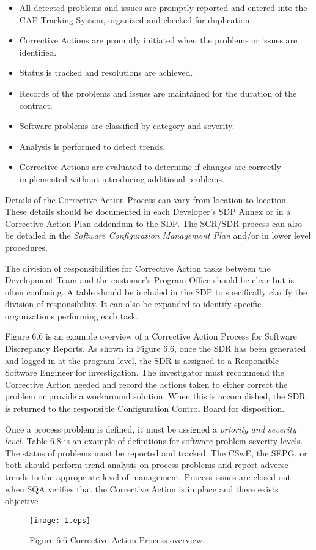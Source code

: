 \documentclass[8pt,twocolumn]{amsart}
\theoremstyle{plain}
\begin{document}
\begin{itemize}
\item All detected problems and issues are promptly reported and entered into the CAP Tracking System, organized and checked for duplication.
\item Corrective Actions are promptly initiated when the problems or issues are identified. 
\item Status is tracked and resolutions are achieved.
\item Records of the problems and issues are maintained for the duration of the contract.
\item Software problems are classified by category and severity.
\item Analysis is performed to detect trends.
\item Corrective Actions are evaluated to determine if changes are correctly implemented without introducing additional problems.
\end{itemize}

Details of the Corrective Action Process can vary from location to location. These details should be documented in each Developer's SDP Annex or in a Corrective Action Plan addendum to the SDP. The SCR/SDR process can also be detailed in the {\em Software Configuration Management Plan} and/or in lower level procedures.

The division of responsibilities for Corrective Action tasks between the Development Team and the customer's Program Office should be clear but is often confusing. A table should be included in the SDP to specifically clarify the division of responsibility. It can also be expanded to identify specific organizations performing each task.

Figure 6.6 is an example overview of a Corrective Action Process for Software Discrepancy Reports. As shown in Figure 6.6, once the SDR has been generated and logged in at the program level, the SDR is assigned to a Responsible Software Engineer for investigation. The investigator must recommend the Corrective Action needed and record the actions taken to either correct the problem or provide a workaround solution. When this is accomplished, the SDR is returned to the responsible Configuration Control Board for disposition.

Once a process problem is defined, it must be assigned a {\em priority and severity level.} Table 6.8 is an example of definitions for software problem severity levels. The status of problems must be reported and tracked. The CSwE, the SEPG, or both should perform trend analysis on process problems and report adverse trends to the appropriate level of management. Process issues are closed out when SQA verifies that the Corrective Action is in place and there exists objective
\onecolumn
\begin{figure*}[h!]
 \centering
  \texttt{[image: 1.eps]}
 \caption{Figure 6.6 Corrective Action Process overview.}
 \end{figure*}
\end{document}
